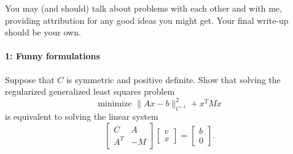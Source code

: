 \documentclass[12pt, leqno]{article} %
\begin{document}

You may (and should) talk about problems with each other and with me,
providing attribution for any good ideas you might get.  Your final
write-up should be your own.

\paragraph*{1: Funny formulations}
Suppose that $C$ is symmetric and positive definite.  Show that
solving the regularized generalized least squares problem
\[
  \mbox{minimize } \|Ax-b\|_{C^{-1}}^2 + x^T M x
\]
is equivalent to solving the linear system
\[
  \begin{bmatrix} C & A \\ A^T & -M \end{bmatrix}
  \begin{bmatrix} v \\ x \end{bmatrix} =
  \begin{bmatrix} b \\ 0 \end{bmatrix}.
\]
\end{document}
